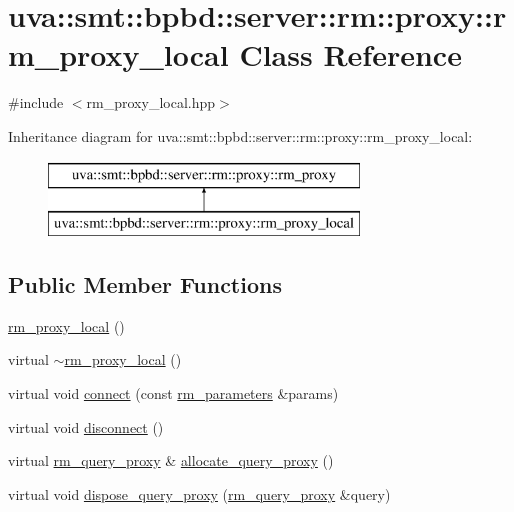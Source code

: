 \hypertarget{classuva_1_1smt_1_1bpbd_1_1server_1_1rm_1_1proxy_1_1rm__proxy__local}{}\section{uva\+:\+:smt\+:\+:bpbd\+:\+:server\+:\+:rm\+:\+:proxy\+:\+:rm\+\_\+proxy\+\_\+local Class Reference}
\label{classuva_1_1smt_1_1bpbd_1_1server_1_1rm_1_1proxy_1_1rm__proxy__local}


{\ttfamily \#include $<$rm\+\_\+proxy\+\_\+local.\+hpp$>$}

Inheritance diagram for uva\+:\+:smt\+:\+:bpbd\+:\+:server\+:\+:rm\+:\+:proxy\+:\+:rm\+\_\+proxy\+\_\+local\+:\begin{figure}[H]
\begin{center}
\leavevmode
\includegraphics[height=2.000000cm]{classuva_1_1smt_1_1bpbd_1_1server_1_1rm_1_1proxy_1_1rm__proxy__local}
\end{center}
\end{figure}
\subsection*{Public Member Functions}
\begin{DoxyCompactItemize}
\item 
\hyperlink{classuva_1_1smt_1_1bpbd_1_1server_1_1rm_1_1proxy_1_1rm__proxy__local_a334f263b374281ce703231302212617a}{rm\+\_\+proxy\+\_\+local} ()
\item 
virtual \hyperlink{classuva_1_1smt_1_1bpbd_1_1server_1_1rm_1_1proxy_1_1rm__proxy__local_a6fd8b6d8147f51c847fee206b80b237c}{$\sim$rm\+\_\+proxy\+\_\+local} ()
\item 
virtual void \hyperlink{classuva_1_1smt_1_1bpbd_1_1server_1_1rm_1_1proxy_1_1rm__proxy__local_a7a92980f74178062d198640cd55ed57c}{connect} (const \hyperlink{structuva_1_1smt_1_1bpbd_1_1server_1_1rm_1_1rm__parameters}{rm\+\_\+parameters} \&params)
\item 
virtual void \hyperlink{classuva_1_1smt_1_1bpbd_1_1server_1_1rm_1_1proxy_1_1rm__proxy__local_a43f0158c8eba7c695b57a6c9245b61fc}{disconnect} ()
\item 
virtual \hyperlink{classuva_1_1smt_1_1bpbd_1_1server_1_1rm_1_1proxy_1_1rm__query__proxy}{rm\+\_\+query\+\_\+proxy} \& \hyperlink{classuva_1_1smt_1_1bpbd_1_1server_1_1rm_1_1proxy_1_1rm__proxy__local_a697c5402937d2f3f55500ed1c2074fc7}{allocate\+\_\+query\+\_\+proxy} ()
\item 
virtual void \hyperlink{classuva_1_1smt_1_1bpbd_1_1server_1_1rm_1_1proxy_1_1rm__proxy__local_a3a26102b7b9b3ecc4d1a8627751406a6}{dispose\+\_\+query\+\_\+proxy} (\hyperlink{classuva_1_1smt_1_1bpbd_1_1server_1_1rm_1_1proxy_1_1rm__query__proxy}{rm\+\_\+query\+\_\+proxy} \&query)
\end{DoxyCompactItemize}
